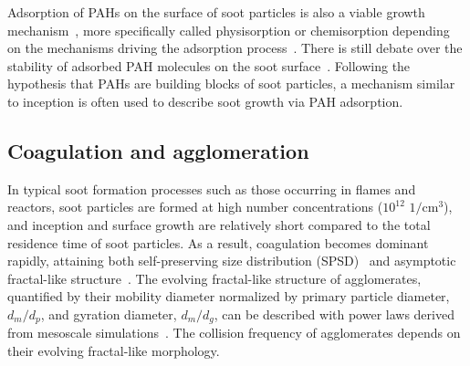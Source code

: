 
Adsorption of PAHs on the surface of soot particles is also a viable growth mechanism~\citep{frenklach1991detailed}, more specifically called physisorption or chemisorption depending on the mechanisms driving the adsorption process~\citep{michelsen2020review}. There is still debate over the stability of adsorbed PAH molecules on the soot surface~\citep{obolensky2007interplay}. Following the hypothesis that PAHs are building blocks of soot particles, a mechanism similar to inception is often used to describe soot growth via PAH adsorption.


\subsection{Coagulation and agglomeration}

In typical soot formation processes such as those occurring in flames and reactors, soot particles are formed at high number concentrations ($\mathrm{10^{12}}$ $\mathrm{1/cm^3}$), and inception and surface growth are relatively short compared to the total residence time of soot particles. As a result, coagulation becomes dominant rapidly, attaining both self-preserving size distribution (SPSD)~\citep{lai1972self} and asymptotic fractal-like structure~\citep{mountain1986simulation}. The evolving fractal-like structure of agglomerates, quantified by their mobility diameter normalized by primary particle diameter, $d_m/d_p$, and gyration diameter, $d_m/d_g$, can be described with power laws derived from mesoscale simulations~\citep{Kelesidis2017}. The collision frequency of agglomerates depends on their evolving fractal-like morphology.

